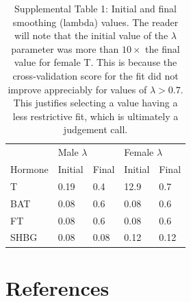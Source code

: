 \documentclass[]{elsarticle} %
\begin{document}
\begin{table}[]
\caption*{Supplemental Table 1: Initial and final smoothing (lambda) values. The reader will note that the initial value of the $\lambda$ parameter was more than $10\times$ the final value for female T. This is because the cross-validation score for the fit did not improve appreciably for values of $\lambda > 0.7$.  This justifies selecting a value having a less restrictive fit, which is ultimately a judgement call. }
\label{tab:my-table}
\begin{tabular}{l|llll}
                          & \multicolumn{2}{l}{Male $\lambda$} & \multicolumn{2}{l}{Female $\lambda$} \\ \cline{2-5} 
Hormone                   & Initial       & Final          & Initial        & Final            \\ \hline
T                         & 0.19           & 0.4            & 12.9          & 0.7              \\
BAT                       & 0.08           & 0.6            & 0.08          & 0.6              \\
FT                        & 0.08           & 0.6            & 0.08          & 0.6              \\
SHBG                      & 0.08           & 0.08           & 0.12          & 0.12       
\end{tabular}
\end{table}

\hypertarget{references}{%
\section*{References}\label{references}}
\end{document}
